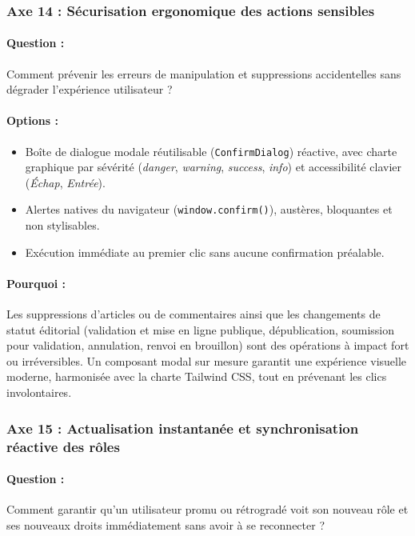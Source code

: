 \documentclass[11pt,a4paper]{article}
\begin{document}
\subsubsection{Axe 14 : Sécurisation ergonomique des actions sensibles}
\paragraph{Question :} Comment prévenir les erreurs de manipulation et suppressions accidentelles sans dégrader l'expérience utilisateur ?
\paragraph{Options :}
\begin{itemize}
    \item[$\boxtimes$] Boîte de dialogue modale réutilisable (\texttt{ConfirmDialog}) réactive, avec charte graphique par sévérité (\textit{danger}, \textit{warning}, \textit{success}, \textit{info}) et accessibilité clavier (\textit{Échap}, \textit{Entrée}).
    \item[$\square$] Alertes natives du navigateur (\texttt{window.confirm()}), austères, bloquantes et non stylisables.
    \item[$\square$] Exécution immédiate au premier clic sans aucune confirmation préalable.
\end{itemize}
\paragraph{Pourquoi :} Les suppressions d'articles ou de commentaires ainsi que les changements de statut éditorial (validation et mise en ligne publique, dépublication, soumission pour validation, annulation, renvoi en brouillon) sont des opérations à impact fort ou irréversibles. Un composant modal sur mesure garantit une expérience visuelle moderne, harmonisée avec la charte Tailwind CSS, tout en prévenant les clics involontaires.

\subsubsection{Axe 15 : Actualisation instantanée et synchronisation réactive des rôles}
\paragraph{Question :} Comment garantir qu'un utilisateur promu ou rétrogradé voit son nouveau rôle et ses nouveaux droits immédiatement sans avoir à se reconnecter ?
\end{document}
